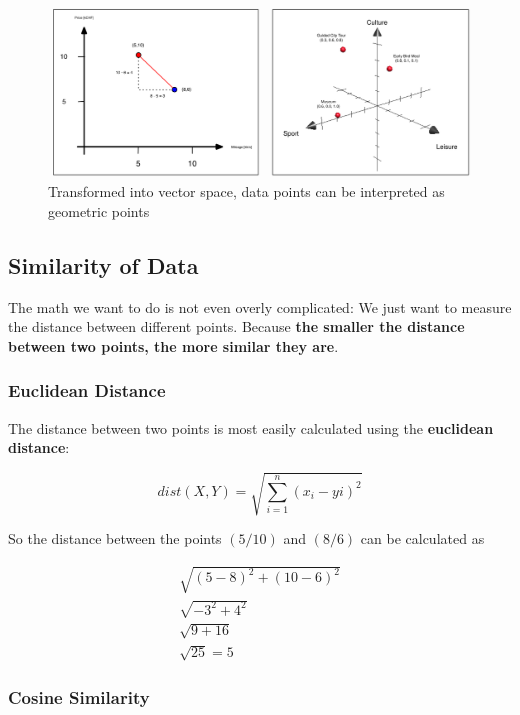 \documentclass[a4paper, 11pt]{article}
\begin{document}
\begin{figure}[htb!]
    \centering
    \includegraphics[keepaspectratio=true, width=\linewidth]{geometric_interpretation.png}
    \caption{Transformed into vector space, data points can be interpreted as geometric points}
    \label{fig:geometric_intepretation}
\end{figure}

\newpage

\subsection{Similarity of Data}

The math we want to do is not even overly complicated: We just want to measure the distance between different points. Because \textbf{the smaller the distance between two points, the more similar they are}. 

\subsubsection{Euclidean Distance}

The distance between two points is most easily calculated using the \textbf{euclidean distance}:

\begin{equation}
	dist(X,Y)= \sqrt{\sum^{n}_{i=1}(x_{i}-y{i})^2} 
\end{equation}

So the distance between the points $(5/10)$ and $(8/6)$ can be calculated as

\begin{align*}
    \sqrt{(5-8)^2 + (10-6)^2} \\
    \sqrt{-3^2 + 4^2} \\
    \sqrt{9+16} \\ 
    \sqrt{25} = 5
\end{align*}

\newpage

\subsubsection{Cosine Similarity}
\end{document}
